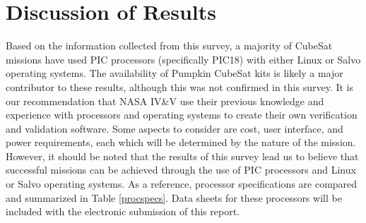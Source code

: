 \documentclass[11pt]{article}
\begin{document}
\section{Discussion of Results}
Based on the information collected from this survey, a majority of CubeSat missions have used PIC processors (specifically PIC18) with either Linux or Salvo operating systems.  The availability of Pumpkin CubeSat kits is likely a major contributor to these results, although this was not confirmed in this survey.  It is our recommendation that NASA IV\&V use their previous knowledge and experience with processors and operating systems to create their own verification and validation software.  Some aspects to consider are cost, user interface, and power requirements, each which will be determined by the nature of the mission.  However, it should be noted that the results of this survey lead us to believe that successful missions can be achieved through the use of PIC processors and Linux or Salvo operating systems.  As a reference, processor specifications are compared and summarized in Table \ref{procspecs}.  Data sheets for these processors will be included with the electronic submission of this report.

\begin{table}[h]
\centering
\caption{Processor Specifications}
\label{procspecs}
\end{table}
\end{document}
